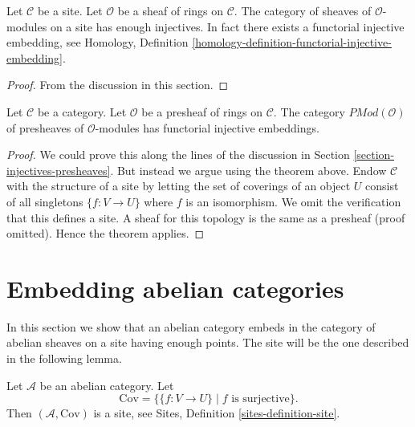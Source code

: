 \begin{theorem}
\label{theorem-sheaves-modules-injectives}
Let $\mathcal{C}$ be a site.
Let $\mathcal{O}$ be a sheaf of rings on $\mathcal{C}$.
The category of sheaves of $\mathcal{O}$-modules on a
site has enough injectives. In fact there exists
a functorial injective embedding, see
Homology, Definition \ref{homology-definition-functorial-injective-embedding}.
\end{theorem}

\begin{proof}
From the discussion in this section.
\end{proof}

\begin{proposition}
\label{proposition-presheaves-modules}
Let $\mathcal{C}$ be a category.
Let $\mathcal{O}$ be a presheaf of rings on $\mathcal{C}$.
The category $\textit{PMod}(\mathcal{O})$ of presheaves of
$\mathcal{O}$-modules has functorial injective embeddings.
\end{proposition}

\begin{proof}
We could prove this along the lines of the discussion in
Section \ref{section-injectives-presheaves}. But instead we argue using the
theorem above. Endow $\mathcal{C}$ with the structure of a site by letting the
set of coverings of an object $U$ consist of all singletons $\{f : V \to U\}$
where $f$ is an isomorphism. We omit the verification that this defines a site.
A sheaf for this topology is the same as a presheaf (proof omitted). Hence the
theorem applies.
\end{proof}








\section{Embedding abelian categories}
\label{section-embedding}

\noindent
In this section we show that an abelian category embeds in the
category of abelian sheaves on a site having enough points.
The site will be the one described in the following lemma.

\begin{lemma}
\label{lemma-site-abelian-category}
Let $\mathcal{A}$ be an abelian category.
Let
$$
\text{Cov} = \{\{f : V \to U\} \mid f\text{ is surjective}\}.
$$
Then $(\mathcal{A}, \text{Cov})$ is a site, see
Sites, Definition \ref{sites-definition-site}.
\end{lemma}

